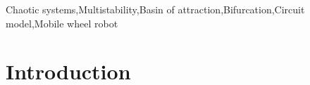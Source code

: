 \documentclass[final,5p,times,twocolumn]{elsarticle}
\begin{document}
\begin{frontmatter}

\begin{comment}
\begin{highlights}
\item Proposal for a new chaotic system with multistability including two symmetrical chaotic attractors and two fixed point attractors.
\item Basin of attraction is computed using an algorithm based on identification of the Poincar\'e section to reveal multistability.
\item Bifurcation analysis is made to reveal parametric region of chaos and region of bistability.
\item Lyapunov spectrum, Kaplan-Yorke dimension, and shrinkage of a volume in phase space is used to deduce the existence of a chaotic strange attractor.
\item Rigorous design of electronic model of the new system is presented and simulation is realized using PSpice-AD
\item Circuit model of the new system is implemented in hardware
\item Independent navigation of a mobile wheel robot is realized with control inputs sourced from the new chaotic system.
\item The mobile wheel robot has fast terrain coverage.
\end{highlights}
\end{comment}

\begin{keyword}
Chaotic systems\sep Multistability\sep Basin of attraction\sep Bifurcation\sep Circuit model\sep Mobile wheel robot


\end{keyword}

\end{frontmatter}


\section{Introduction}
\end{document}
